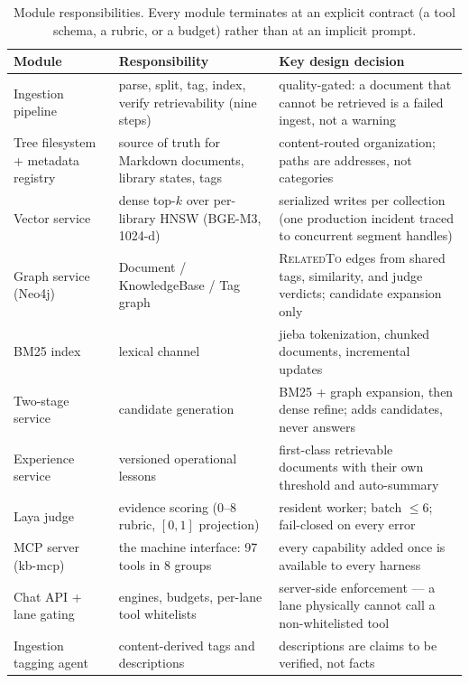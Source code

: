 \begin{table}[!htbp]
\centering
\footnotesize
\setlength{\tabcolsep}{3.5pt}
\caption{Module responsibilities. Every module terminates at an explicit
contract (a tool schema, a rubric, or a budget) rather than at an
implicit prompt.}
\label{tab:modules}
\begin{tabular}{p{2.9cm}p{4.1cm}p{6.0cm}}
\toprule
Module & Responsibility & Key design decision \\
\midrule
Ingestion pipeline & parse, split, tag, index, verify retrievability
(nine steps) & quality-gated: a document that cannot be retrieved is a
failed ingest, not a warning \\
Tree filesystem + metadata registry & source of truth for Markdown
documents, library states, tags & content-routed organization; paths are
addresses, not categories \\
Vector service & dense top-$k$ over per-library HNSW (BGE-M3, 1024-d) &
serialized writes per collection (one production incident traced to
concurrent segment handles) \\
Graph service (Neo4j) & Document / KnowledgeBase / Tag graph &
\textsc{RelatedTo} edges from shared tags, similarity, and judge
verdicts; candidate expansion only \\
BM25 index & lexical channel & jieba tokenization, chunked documents,
incremental updates \\
Two-stage service & candidate generation & BM25 + graph expansion, then
dense refine; adds candidates, never answers \\
Experience service & versioned operational lessons & first-class
retrievable documents with their own threshold and auto-summary \\
Laya judge & evidence scoring (0--8 rubric, $[0,1]$ projection) &
resident worker; batch $\leq 6$; fail-closed on every error \\
MCP server (kb-mcp) & the machine interface: 97 tools in 8 groups &
every capability added once is available to every harness \\
Chat API + lane gating & engines, budgets, per-lane tool whitelists &
server-side enforcement --- a lane physically cannot call a
non-whitelisted tool \\
Ingestion tagging agent & content-derived tags and descriptions &
descriptions are claims to be verified, not facts \\
\bottomrule
\end{tabular}
\end{table}

